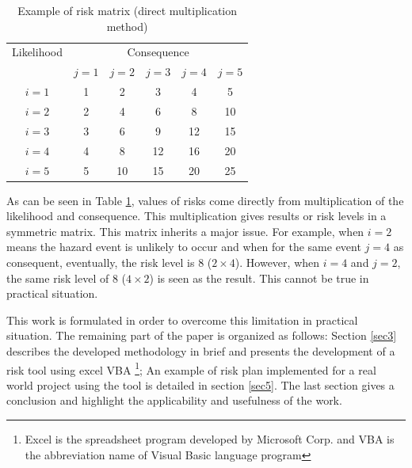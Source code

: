 \documentclass[10pt,halfline,a4paper]{ouparticle}
\begin{document}
\begin{table}
	\centering
	\caption{Example of risk matrix (direct multiplication method)} 
	\begin{tabular}{l|l|l|l|l|l}
		\hline
		\multicolumn{1}{c|}{Likelihood} & \multicolumn{5}{c}{Consequence} \\ 
		\cline{2-6}
		\multicolumn{1}{c|}{} & \multicolumn{1}{c|}{$j=1$} & \multicolumn{1}{c|}{$j=2$} & \multicolumn{1}{c|}{$j=3$} & \multicolumn{1}{c|}{$j=4$} & \multicolumn{1}{c}{$j=5$} \\ 
		\hline
		\multicolumn{1}{c|}{$i=1$} & \multicolumn{1}{c|}{1} & \multicolumn{1}{c|}{2} & \multicolumn{1}{c|}{3} & \multicolumn{1}{c|}{4} & \multicolumn{1}{c}{5} \\ 
		\multicolumn{1}{c|}{$i=2$} & \multicolumn{1}{c|}{2} & \multicolumn{1}{c|}{4} & \multicolumn{1}{c|}{6} & \multicolumn{1}{c|}{8} & \multicolumn{1}{c}{10} \\ 
		\multicolumn{1}{c|}{$i=3$} & \multicolumn{1}{c|}{3} & \multicolumn{1}{c|}{6} & \multicolumn{1}{c|}{9} & \multicolumn{1}{c|}{12} & \multicolumn{1}{c}{15} \\ 
		\multicolumn{1}{c|}{$i=4$} & \multicolumn{1}{c|}{4} & \multicolumn{1}{c|}{8} & \multicolumn{1}{c|}{12} & \multicolumn{1}{c|}{16} & \multicolumn{1}{c}{20} \\ 
		\multicolumn{1}{c|}{$i=5$} & \multicolumn{1}{c|}{5} & \multicolumn{1}{c|}{10} & \multicolumn{1}{c|}{15} & \multicolumn{1}{c|}{20} & \multicolumn{1}{c}{25} \\ 
		\hline
	\end{tabular}
	\label{tbl_riskmatrix}
\end{table}
As can be seen in Table \ref{tbl_riskmatrix}, values of risks come directly from multiplication of the likelihood and consequence. This multiplication gives results or risk levels in a symmetric matrix. This matrix inherits a major issue. For example, when $i=2$ means the hazard event is unlikely to occur and when for the same event $j=4$ as consequent, eventually, the risk level is $8$ ($2\times4$). However, when $i=4$ and $j=2$, the same risk level of $8$ ($4 \times 2$) is seen as the result. This cannot be true in practical situation. 

This work is formulated in order to overcome this limitation in practical situation. The remaining part of the paper is organized as follows: Section \ref{sec3} describes the developed methodology in brief and presents the development of a risk tool using excel VBA \footnote{Excel is the spreadsheet program developed by Microsoft Corp. and VBA is the abbreviation name of Visual Basic language program}; An example of risk plan implemented for a real world project using the tool is detailed in section \ref{sec5}. The last section gives a conclusion and highlight the applicability and usefulness of the work.
\end{document}
